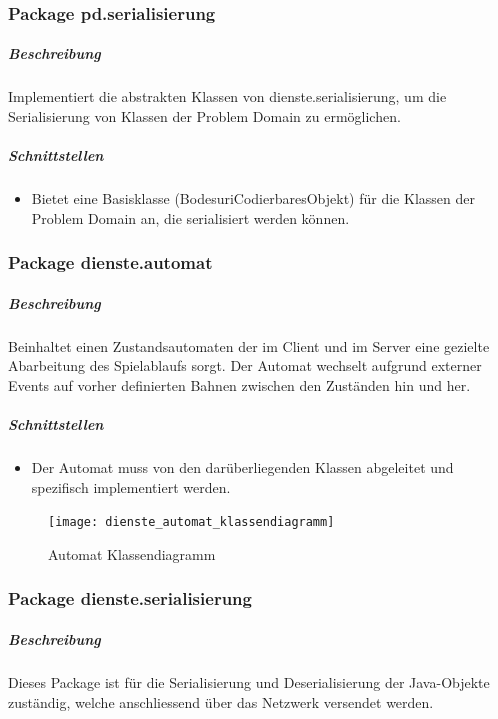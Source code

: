 \documentclass[12pt,halfparskip]{scrartcl}
\begin{document}

\clearpage
\subsubsection{Package pd.serialisierung}

\subparagraph{Beschreibung}
Implementiert die abstrakten Klassen von dienste.serialisierung, um die Serialisierung von Klassen der Problem Domain zu ermöglichen.

\subparagraph{Schnittstellen}
\begin{itemize}
	\item Bietet eine Basisklasse (BodesuriCodierbaresObjekt) für die Klassen der Problem Domain an, die serialisiert werden können.
\end{itemize}

\clearpage
\subsubsection{Package dienste.automat} %
\label{ssub:package_dienste}
\subparagraph{Beschreibung}
Beinhaltet einen Zustandsautomaten der im Client und im Server eine gezielte Abarbeitung
des Spielablaufs sorgt. Der Automat wechselt aufgrund externer Events auf vorher definierten
Bahnen zwischen den Zuständen hin und her.

\subparagraph{Schnittstellen} %
\label{ssub:schnittstellen}
\begin{itemize}
	\item Der Automat muss von den darüberliegenden Klassen abgeleitet und spezifisch implementiert werden.
\end{itemize}	

\begin{figure}[h]
	\centering
	\texttt{[image: dienste\_automat\_klassendiagramm]}
	\caption{Automat Klassendiagramm}
	\label{fig:dienste_serialisierung}
\end{figure}


\clearpage
\subsubsection{Package dienste.serialisierung}

\subparagraph{Beschreibung}
Dieses Package ist für die Serialisierung und Deserialisierung der Java-Objekte zuständig, welche anschliessend über das Netzwerk versendet werden.
\end{document}

